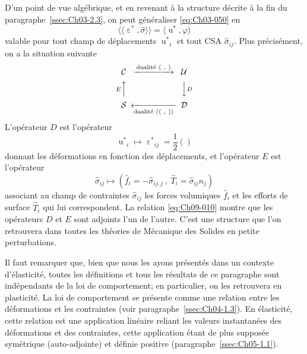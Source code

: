 D'un point de vue algébrique, et en revenant à la structure décrite à la fin du paragraphe~\ref{ssec:Ch03-2.3}, on peut généraliser \eqref{eq:Ch03-050} en
\begin{equation}
    \langle \langle \mathop{\varepsilon}^{\ast}, \hat{\sigma} \rangle \rangle = \langle \mathop{u}^{\ast}, \varphi \rangle
    \label{eq:Ch09-010}
\end{equation}
valable pour tout champ de déplacements ${\mathop{u}^{\ast}}_i$ et tout CSA $\hat{\sigma}_{ij}$.
Plus précisément, on a la situation suivante
\[
\begin{CD}
    \mathcal{C} @>{\text{dualité } \langle\ ,\ \rangle}>> \mathcal{U} \\
    @AEAA    @VVDV \\
    \mathcal{S} @<<{\text{dualité } \langle\langle\ ,\ \rangle\rangle}< \mathcal{D}
\end{CD}
\]
L'opérateur $D$ est l'opérateur
\begin{equation}
    {\mathop{u}^{\ast}}_i \mapsto {\mathop{\varepsilon}^{\ast}}_{ij} = \frac{1}{2} \left(  \right)
    \label{eq:Ch09-011}
\end{equation}
donnant les déformations en fonction des déplacements, et l'opérateur $E$ est l'opérateur
\begin{equation}
    \hat{\sigma}_{ij} \mapsto \left( \hat{f}_i = - \hat{\sigma}_{ij,j}\ , \ \hat{T}_i = \hat{\sigma}_{ij} n_j \right)
    \label{eq:Ch09-012}
\end{equation}
associant au champ de contraintes $\hat{\sigma}_{ij}$ les forces volumiques $\hat{f}_i$ et les efforts de surface $\hat{T}_i$ qui lui correspondent.
La relation \eqref{eq:Ch09-010} montre que les opérateurs $D$ et $E$ sont adjoints l'un de l'autre.
C'est une structure que l'on retrouvera dans toutes les théories de Mécanique des Solides en petite perturbations.

Il faut remarquer que, bien que nous les ayons présentés dans un contexte d'élasticité, toutes les définitions et tous les résultats de ce paragraphe sont indépendants de la loi de comportement; en particulier, on les retrouvera en plasticité.
La loi de comportement se présente comme une relation entre les déformations et les contraintes (voir paragraphe~\ref{ssec:Ch04-1.3}).
En élasticité, cette relation est une application linéaire reliant les valeurs instantanées des déformations et des contraintes, cette application étant de plus supposée symétrique (auto-adjointe) et définie positive (paragraphe~\ref{ssec:Ch05-1.1}). 

